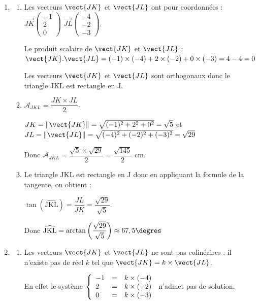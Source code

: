 \bigskip

\begin{enumerate}
	\item 
	\begin{enumerate}
		\item Les vecteurs $\vect{JK}$ et $\vect{JL}$ ont pour coordonnées : \(\overrightarrow{JK}\begin{pmatrix}-1\\2\\0\end{pmatrix}\) \quad \(\overrightarrow{JL}\begin{pmatrix}-4\\-2\\-3\end{pmatrix}\).

Le produit scalaire de  $\vect{JK}$ et $\vect{JL}$ : $\vect{JK}.\vect{JL}=(-1)\times(-4)+2\times (-2)+0\times (-3)=4-4=0$

Les vecteurs $\vect{JK}$ et $\vect{JL}$ sont orthogonaux donc le triangle JKL est rectangle en J.
		\item $\mathcal{A}_{JKL}=\dfrac{JK\times JL}{2}$.

		$JK= \left\|\vect{JK}\right\| =\sqrt{(-1)^2+2^2+0^2}=\sqrt{5}$ et $JL=\left\|\vect{JL}\right\|=\sqrt{(-4)^2+(-2)^2+(-3)^2}=\sqrt{29}$

Donc $\mathcal{A}_{JKL}=\dfrac{\sqrt{5}\times \sqrt{29}}{2}=\dfrac{\sqrt{145}}{2}$ cm.
		\item Le triangle JKL est rectangle en J donc en appliquant la formule de la tangente, on obtient :

		$\tan \left(\widehat{\text{JKL}}\right)=\dfrac{JL}{JK}=\dfrac{\sqrt{29}}{\sqrt{5}}$.

Donc $\widehat{\text{JKL}}=\arctan\left(\dfrac{\sqrt{29}}{\sqrt{5}}\right)\approx 67,5\degres$
	\end{enumerate}

	\item
	\begin{enumerate}
\item Les vecteurs $\vect{JK}$ et $\vect{JL}$ ne sont pas colinéaires : il n'existe pas de réel $k$ tel que $\vect{JK}=k\times \vect{JL}$.

En effet le système $\left\{\begin{array}{l c l} -1&=&k\times (-4)\\2 &=& k\times (-2)\\0&=& k\times (-3) \end{array}\right.$ n'admet pas de solution.


\end{enumerate}
\end{enumerate}
